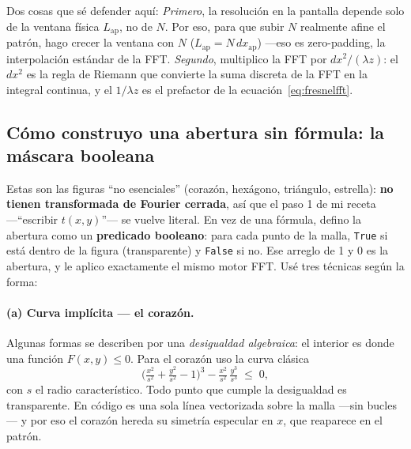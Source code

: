 \documentclass[11pt,a4paper]{article}
\begin{document}
\begin{decir}
Dos cosas que sé defender aquí: \emph{Primero}, la resolución en la pantalla
depende solo de la ventana física $L_\text{ap}$, no de $N$. Por eso, para que subir
$N$ realmente afine el patrón, hago crecer la ventana con $N$
($L_\text{ap}=N\,dx_\text{ap}$) ---eso es zero-padding, la interpolación estándar de
la FFT. \emph{Segundo}, multiplico la FFT por $dx^2/(\lambda z)$: el $dx^2$ es la
regla de Riemann que convierte la suma discreta de la FFT en la integral continua,
y el $1/\lambda z$ es el prefactor de la ecuación~\eqref{eq:fresnelfft}.
\end{decir}

\subsection{Cómo construyo una abertura sin fórmula: la máscara booleana}

Estas son las figuras ``no esenciales'' (corazón, hexágono, triángulo, estrella):
\textbf{no tienen transformada de Fourier cerrada}, así que el paso 1 de mi receta
---``escribir $t(x,y)$''--- se vuelve literal. En vez de una fórmula, defino la
abertura como un \textbf{predicado booleano}: para cada punto de la malla,
\texttt{True} si está dentro de la figura (transparente) y \texttt{False} si no.
Ese arreglo de 1 y 0 es la abertura, y le aplico exactamente el mismo motor FFT.
Usé tres técnicas según la forma:

\paragraph{(a) Curva implícita --- el corazón.}
Algunas formas se describen por una \emph{desigualdad algebraica}: el interior es
donde una función $F(x,y)\le0$. Para el corazón uso la curva clásica
\[
\Big(\tfrac{x^2}{s^2}+\tfrac{y^2}{s^2}-1\Big)^{\!3}
-\tfrac{x^2}{s^2}\,\tfrac{y^3}{s^3}\;\le\;0 ,
\]
con $s$ el radio característico. Todo punto que cumple la desigualdad es
transparente. En código es una sola línea vectorizada sobre la malla ---sin
bucles--- y por eso el corazón hereda su simetría especular en $x$, que reaparece
en el patrón.
\end{document}
